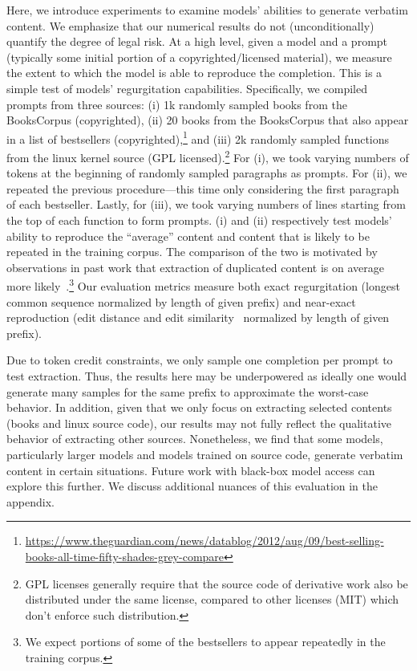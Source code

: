 Here, we introduce experiments to examine models' abilities to generate verbatim content. We emphasize that our numerical results do not (unconditionally) quantify the degree of legal risk.
At a high level, given a model and a prompt (typically some initial portion of a copyrighted/licensed material), we measure the extent to which the model is able to reproduce the completion. 
This is a simple test of models' regurgitation capabilities. 
Specifically, we compiled prompts from three sources:
(i) 1k randomly sampled books from the BooksCorpus (copyrighted), 
(ii) 20 books from the BooksCorpus that also appear in a list of bestsellers (copyrighted),\footnote{\url{https://www.theguardian.com/news/datablog/2012/aug/09/best-selling-books-all-time-fifty-shades-grey-compare}} and (iii) 2k randomly sampled functions from the linux kernel source (GPL licensed).\footnote{GPL licenses generally require that the source code of derivative work also be distributed under the same license, compared to other licenses (\eg MIT) which don't enforce such distribution.}
For (i), we took varying numbers of tokens at the beginning of randomly sampled paragraphs as prompts.
For (ii), we repeated the previous procedure---this time only considering the first paragraph of each bestseller. 
Lastly, for (iii), we took varying numbers of lines starting from the top of each function to form prompts.
(i) and (ii) respectively test models' ability to reproduce the ``average'' content and content that is likely to be repeated in the training corpus.
The comparison of the two is motivated by observations in past work that extraction of duplicated content is on average more likely~\citep{kandpal2022deduplicating}.\footnote{We expect portions of some of the bestsellers to appear repeatedly in the training corpus.}
Our evaluation metrics measure both exact regurgitation (longest common sequence normalized by length of given prefix) and near-exact reproduction (edit distance and edit similarity~\citep{lee2021deduplicating} normalized by length of given prefix). 


Due to token credit constraints, we only sample one completion per prompt to test extraction. 
Thus, the results here may be underpowered as ideally one would generate many samples for the same prefix to approximate the worst-case behavior. 
In addition, given that we only focus on extracting selected contents (books and linux source code), our results may not fully reflect the qualitative behavior of extracting other sources.
Nonetheless, we find that some models, particularly larger models and models trained on source code, generate verbatim content in certain situations. 
Future work with black-box model access can explore this further.
We discuss additional nuances of this evaluation in the appendix.

